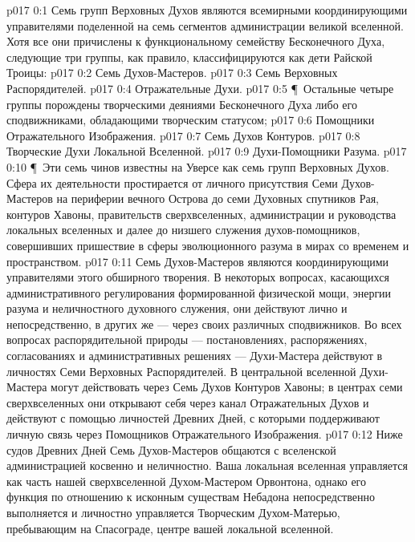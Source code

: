 \vs p017 0:1 Семь групп Верховных Духов являются всемирными координирующими управителями поделенной на семь сегментов администрации великой вселенной. Хотя все они причислены к функциональному семейству Бесконечного Духа, следующие три группы, как правило, классифицируются как дети Райской Троицы:
\vs p017 0:2 \bibnobreakspace Семь Духов\hyp{}Мастеров.
\vs p017 0:3 \bibnobreakspace Семь Верховных Распорядителей.
\vs p017 0:4 \bibnobreakspace Отражательные Духи.
\vs p017 0:5 \P\ Остальные четыре группы порождены творческими деяниями Бесконечного Духа либо его сподвижниками, обладающими творческим статусом;
\vs p017 0:6 \bibnobreakspace Помощники Отражательного Изображения.
\vs p017 0:7 \bibnobreakspace Семь Духов Контуров.
\vs p017 0:8 \bibnobreakspace Творческие Духи Локальной Вселенной.
\vs p017 0:9 \bibnobreakspace Духи\hyp{}Помощники Разума.
\vs p017 0:10 \P\ Эти семь чинов известны на Уверсе как семь групп Верховных Духов. Сфера их деятельности простирается от личного присутствия Семи Духов\hyp{}Мастеров на периферии вечного Острова до семи Духовных спутников Рая, контуров Хавоны, правительств сверхвселенных, администрации и руководства локальных вселенных и далее до низшего служения духов\hyp{}помощников, совершивших пришествие в сферы эволюционного разума в мирах со временем и пространством.
\vs p017 0:11 Семь Духов\hyp{}Мастеров являются координирующими управителями этого обширного творения. В некоторых вопросах, касающихся административного регулирования формированной физической мощи, энергии разума и неличностного духовного служения, они действуют лично и непосредственно, в других же --- через своих различных сподвижников. Во всех вопросах распорядительной природы --- постановлениях, распоряжениях, согласованиях и административных решениях --- Духи\hyp{}Мастера действуют в личностях Семи Верховных Распорядителей. В центральной вселенной Духи\hyp{}Мастера могут действовать через Семь Духов Контуров Хавоны; в центрах семи сверхвселенных они открывают себя через канал Отражательных Духов и действуют с помощью личностей Древних Дней, с которыми поддерживают личную связь через Помощников Отражательного Изображения.
\vs p017 0:12 Ниже судов Древних Дней Семь Духов\hyp{}Мастеров общаются с вселенской администрацией косвенно и неличностно. Ваша локальная вселенная управляется как часть нашей сверхвселенной Духом\hyp{}Мастером Орвонтона, однако его функция по отношению к исконным существам Небадона непосредственно выполняется и личностно управляется Творческим Духом\hyp{}Матерью, пребывающим на Спасограде, центре вашей локальной вселенной.
